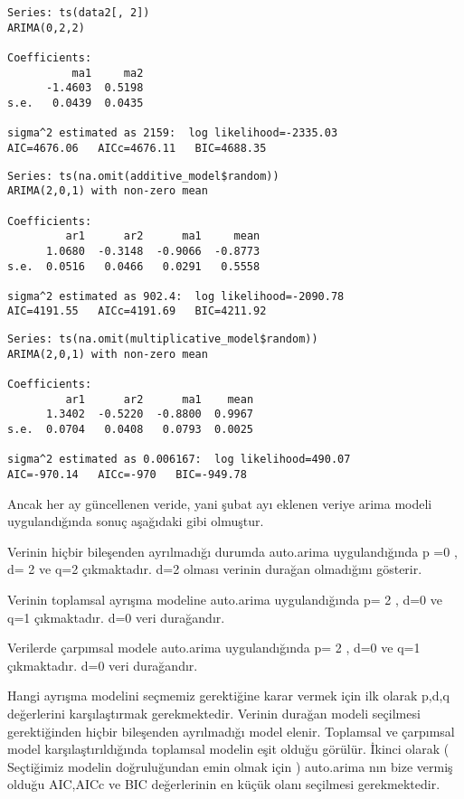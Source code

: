 \documentclass[11pt]{article}
\begin{document}
    
    \begin{verbatim}
Series: ts(data2[, 2]) 
ARIMA(0,2,2) 

Coefficients:
          ma1     ma2
      -1.4603  0.5198
s.e.   0.0439  0.0435

sigma^2 estimated as 2159:  log likelihood=-2335.03
AIC=4676.06   AICc=4676.11   BIC=4688.35
    \end{verbatim}

    
    
    \begin{verbatim}
Series: ts(na.omit(additive_model$random)) 
ARIMA(2,0,1) with non-zero mean 

Coefficients:
         ar1      ar2      ma1     mean
      1.0680  -0.3148  -0.9066  -0.8773
s.e.  0.0516   0.0466   0.0291   0.5558

sigma^2 estimated as 902.4:  log likelihood=-2090.78
AIC=4191.55   AICc=4191.69   BIC=4211.92
    \end{verbatim}

    
    
    \begin{verbatim}
Series: ts(na.omit(multiplicative_model$random)) 
ARIMA(2,0,1) with non-zero mean 

Coefficients:
         ar1      ar2      ma1    mean
      1.3402  -0.5220  -0.8800  0.9967
s.e.  0.0704   0.0408   0.0793  0.0025

sigma^2 estimated as 0.006167:  log likelihood=490.07
AIC=-970.14   AICc=-970   BIC=-949.78
    \end{verbatim}

    
    Ancak her ay güncellenen veride, yani şubat ayı eklenen veriye arima
modeli uygulandığında sonuç aşağıdaki gibi olmuştur.

Verinin hiçbir bileşenden ayrılmadığı durumda auto.arima uygulandığında
p =0 , d= 2 ve q=2 çıkmaktadır. d=2 olması verinin durağan olmadığını
gösterir.

Verinin toplamsal ayrışma modeline auto.arima uygulandığında p= 2 , d=0
ve q=1 çıkmaktadır. d=0 veri durağandır.

Verilerde çarpımsal modele auto.arima uygulandığında p= 2 , d=0 ve q=1
çıkmaktadır. d=0 veri durağandır.

Hangi ayrışma modelini seçmemiz gerektiğine karar vermek için ilk olarak
p,d,q değerlerini karşılaştırmak gerekmektedir. Verinin durağan modeli
seçilmesi gerektiğinden hiçbir bileşenden ayrılmadığı model elenir.
Toplamsal ve çarpımsal model karşılaştırıldığında toplamsal modelin eşit
olduğu görülür. İkinci olarak ( Seçtiğimiz modelin doğruluğundan emin
olmak için ) auto.arima nın bize vermiş olduğu AIC,AICc ve BIC
değerlerinin en küçük olanı seçilmesi gerekmektedir.
\end{document}
